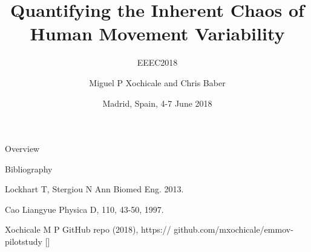 \documentclass[compress]{beamer}
\title{
	Quantifying the Inherent Chaos of \\ 
	Human Movement Variability
	}
\subtitle{EEEC2018}
\date{Madrid, Spain, 4-7 June 2018}
\author{Miguel P Xochicale and Chris Baber}
\institute{School of Engineering \\{\bf University of Birmingham}}
\begin{document}

\maketitle

\begin{frame}{Overview}
\tableofcontents
\end{frame}













\begin{frame}{Bibliography}
    \begin{thebibliography}{10}

\beamertemplatearticlebibitems


      Lockhart T, Stergiou N 
      \newblock {}
	\newblock Ann Biomed Eng. 2013.

      Cao Liangyue
      \newblock {}
      \newblock Physica D, 110, 43-50, 1997.  

      Xochicale M P
      \newblock {}
      \newblock GitHub repo (2018), https:// github.com/mxochicale/emmov-pilotstudy [\href{https:// github.com/mxochicale/emmov-pilotstudy}{\faGithub}]


    \end{thebibliography}
\end{frame}




\closingtitle


\end{document}

